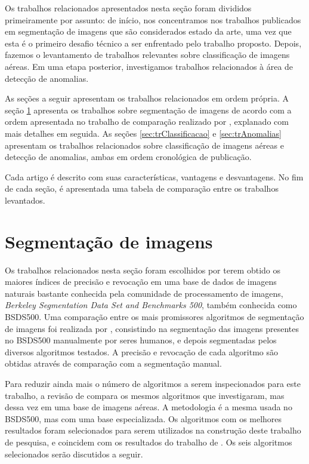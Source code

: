 Os trabalhos relacionados apresentados nesta seção foram divididos primeiramente por assunto: de início, nos concentramos nos trabalhos publicados em segmentação de imagens que são considerados estado da arte, uma vez que esta é o primeiro desafio técnico a ser enfrentado pelo trabalho proposto. Depois, fazemos o levantamento de trabalhos relevantes sobre classificação de imagens aéreas. Em uma etapa posterior, investigamos trabalhos relacionados à área de detecção de anomalias.

As seções a seguir apresentam os trabalhos relacionados em ordem própria.  A seção \ref{sec:trSegmentacao} apresenta os trabalhos sobre segmentação de imagens de acordo com a ordem apresentada no trabalho de comparação realizado por , explanado com mais detalhes em seguida. As seções \ref{sec:trClassificacao} e \ref{sec:trAnomalias} apresentam os trabalhos relacionados sobre classificação de imagens aéreas e detecção de anomalias, ambas em ordem cronológica de publicação.

Cada artigo é descrito com suas características, vantagens e desvantagens. No fim de cada seção, é apresentada uma tabela de comparação entre os trabalhos levantados.

\section{Segmentação de imagens}\label{sec:trSegmentacao}

Os trabalhos relacionados nesta seção foram escolhidos por terem obtido os maiores índices de precisão e revocação em uma base de dados de imagens naturais bastante conhecida pela comunidade de processamento de imagens, \textit{Berkeley Segmentation Data Set and Benchmarks 500}, também conhecida como BSDS500. Uma comparação entre os mais promissores algoritmos de segmentação de imagens foi realizada por , consistindo na segmentação das imagens presentes no BSDS500 manualmente por seres humanos, e depois segmentadas pelos diversos algoritmos testados. A precisão e revocação de cada algoritmo são obtidas através de comparação com a segmentação manual.

Para reduzir ainda mais o número de algoritmos a serem inspecionados para este trabalho, a revisão de  compara os mesmos algoritmos que  investigaram, mas dessa vez em uma base de imagens aéreas. A metodologia é a mesma usada no BSDS500, mas com uma base especializada. Os algoritmos com os melhores resultados foram selecionados para serem utilizados na construção deste trabalho de pesquisa, e coincidem com os resultados do trabalho de . Os seis algoritmos selecionados serão discutidos a seguir.

